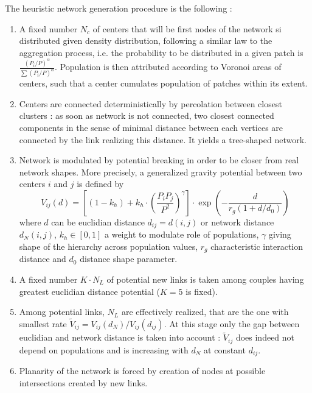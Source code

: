The heuristic network generation procedure is the following :
\begin{enumerate}
\item A fixed number $N_c$ of centers that will be first nodes of the network si distributed given density distribution, following a similar law to the aggregation process, i.e. the probability to be distributed in a given patch is $\frac{(P_i/P)^{\alpha}}{\sum (P_i/P)^{\alpha}}$. Population is then attributed according to Voronoi areas of centers, such that a center cumulates population of patches within its extent.
\item Centers are connected deterministically by percolation between closest clusters : as soon as network is not connected, two closest connected components in the sense of minimal distance between each vertices are connected by the link realizing this distance. It yields a tree-shaped network.
\item Network is modulated by potential breaking in order to be closer from real network shapes. More precisely, a generalized gravity potential between two centers $i$ and $j$ is defined by
\[
V_{ij}(d) = \left[ (1 - k_h) + k_h \cdot \left( \frac{P_i P_j}{P^2} \right)^{\gamma} \right]\cdot \exp{\left( -\frac{d}{r_g (1 + d/d_0)} \right)}
\]
where $d$ can be euclidian distance $d_{ij}=d(i,j)$ or network distance $d_N(i,j)$, $k_h \in [0,1]$ a weight to modulate role of populations, $\gamma$ giving shape of the hierarchy across population values, $r_g$ characteristic interaction distance and $d_0$ distance shape parameter.
\item A fixed number $K\cdot N_L$ of potential new links is taken among couples having greatest euclidian distance potential ($K=5$ is fixed).
\item Among potential links, $N_L$ are effectively realized, that are the one with smallest rate $\tilde{V}_{ij} = V_{ij}(d_N)/V_{ij}(d_{ij})$. At this stage only the gap between euclidian and network distance is taken into account : $\tilde{V}_{ij}$ does indeed not depend on populations and is increasing with $d_N$ at constant $d_{ij}$.
\item Planarity of the network is forced by creation of nodes at possible intersections created by new links.
\end{enumerate}



